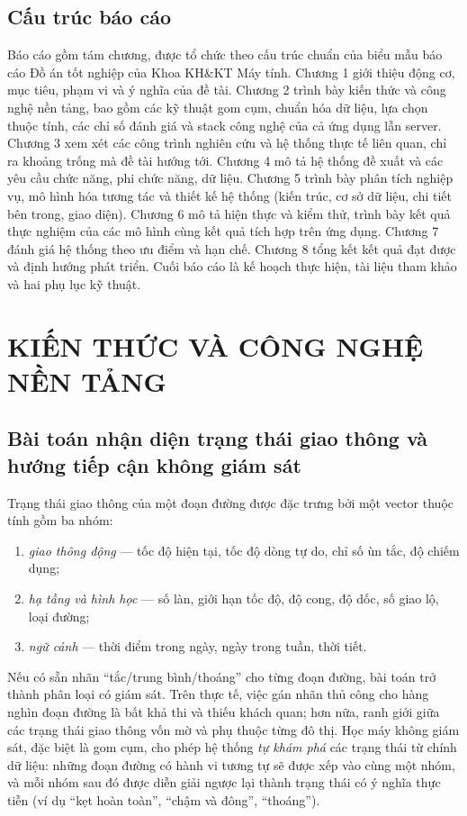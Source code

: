 \section{Cấu trúc báo cáo}
Báo cáo gồm tám chương, được tổ chức theo cấu trúc chuẩn của biểu mẫu báo cáo Đồ án tốt nghiệp của Khoa KH\&KT Máy tính. Chương 1 giới thiệu động cơ, mục tiêu, phạm vi và ý nghĩa của đề tài. Chương 2 trình bày kiến thức và công nghệ nền tảng, bao gồm các kỹ thuật gom cụm, chuẩn hóa dữ liệu, lựa chọn thuộc tính, các chỉ số đánh giá và stack công nghệ của cả ứng dụng lẫn server. Chương 3 xem xét các công trình nghiên cứu và hệ thống thực tế liên quan, chỉ ra khoảng trống mà đề tài hướng tới. Chương 4 mô tả hệ thống đề xuất và các yêu cầu chức năng, phi chức năng, dữ liệu. Chương 5 trình bày phân tích nghiệp vụ, mô hình hóa tương tác và thiết kế hệ thống (kiến trúc, cơ sở dữ liệu, chi tiết bên trong, giao diện). Chương 6 mô tả hiện thực và kiểm thử, trình bày kết quả thực nghiệm của các mô hình cùng kết quả tích hợp trên ứng dụng. Chương 7 đánh giá hệ thống theo ưu điểm và hạn chế. Chương 8 tổng kết kết quả đạt được và định hướng phát triển. Cuối báo cáo là kế hoạch thực hiện, tài liệu tham khảo và hai phụ lục kỹ thuật.

\chapter{KIẾN THỨC VÀ CÔNG NGHỆ NỀN TẢNG}

\section{Bài toán nhận diện trạng thái giao thông và hướng tiếp cận không giám sát}
Trạng thái giao thông của một đoạn đường được đặc trưng bởi một vector thuộc tính gồm ba nhóm:
\begin{enumerate}[label=(\roman*),leftmargin=2.2cm,itemsep=2pt]
 \item \textit{giao thông động} --- tốc độ hiện tại, tốc độ dòng tự do, chỉ số ùn tắc, độ chiếm dụng;
 \item \textit{hạ tầng và hình học} --- số làn, giới hạn tốc độ, độ cong, độ dốc, số giao lộ, loại đường;
 \item \textit{ngữ cảnh} --- thời điểm trong ngày, ngày trong tuần, thời tiết.
\end{enumerate}
Nếu có sẵn nhãn ``tắc/trung bình/thoáng'' cho từng đoạn đường, bài toán trở thành phân loại có giám sát. Trên thực tế, việc gán nhãn thủ công cho hàng nghìn đoạn đường là bất khả thi và thiếu khách quan; hơn nữa, ranh giới giữa các trạng thái giao thông vốn mờ và phụ thuộc từng đô thị. Học máy không giám sát, đặc biệt là gom cụm, cho phép hệ thống \textit{tự khám phá} các trạng thái từ chính dữ liệu: những đoạn đường có hành vi tương tự sẽ được xếp vào cùng một nhóm, và mỗi nhóm sau đó được diễn giải ngược lại thành trạng thái có ý nghĩa thực tiễn (ví dụ ``kẹt hoàn toàn'', ``chậm và đông'', ``thoáng'').

